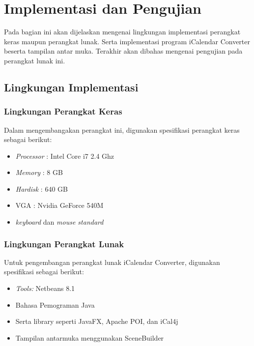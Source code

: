 \chapter{Implementasi dan Pengujian}
\label{chap:implementation}
Pada bagian ini akan dijelaskan mengenai lingkungan implementasi perangkat keras maupun perangkat lunak. Serta implementasi program iCalendar Converter beserta tampilan antar muka. Terakhir akan dibahas mengenai pengujian pada perangkat lunak ini.

\section{Lingkungan Implementasi}

\subsection{Lingkungan Perangkat Keras}
Dalam mengembangakan perangkat ini, digunakan spesifikasi perangkat keras sebagai berikut:
\begin{itemize}
	\item \textit{Processor} : Intel Core i7 2.4 Ghz
	\item \textit{Memory} : 8 GB
	\item \textit{Hardisk} : 640 GB
	\item VGA : Nvidia GeForce 540M
	\item \textit{keyboard} dan \textit{mouse standard}
\end{itemize}

\subsection{Lingkungan Perangkat Lunak}
Untuk pengembangan perangkat lunak iCalendar Converter, digunakan spesifikasi sebagai berikut:
\begin{itemize}
	\item \textit{Tools:} Netbeans 8.1
	\item Bahasa Pemograman Java 
	\item Serta library seperti JavaFX, Apache POI, dan iCal4j
	\item Tampilan antarmuka menggunakan SceneBuilder
\end{itemize}

